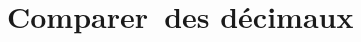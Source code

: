 \chapter{\mbox{Comparer des} \mbox{décimaux}} %



\activites


\cours


\exercicesbase


% 

\Recreation


% 

% 

% 

%
% 